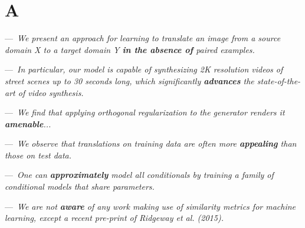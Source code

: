 \section{A}


 ---~\textit{We present an approach for learning to translate an image from a source domain X to a target domain Y \textbf{in the absence of} paired examples.}


 ---~\textit{In particular, our model is capable of synthesizing 2K resolution videos of street scenes up to 30 seconds long, which significantly \textbf{advances} the state-of-the-art of video synthesis.}
 
  ---~\textit{We
find that applying orthogonal regularization to the generator renders it \textbf{amenable}...}

 ---~\textit{We observe that translations on training data are often more \textbf{appealing} than those on test data.}


 ---~\textit{One can \textbf{approximately} model all conditionals by training a family of conditional models that share parameters.}

 ---~\textit{We are not \textbf{aware} of any work making use of similarity metrics for machine learning, except a recent pre-print of Ridgeway et al. (2015).}






